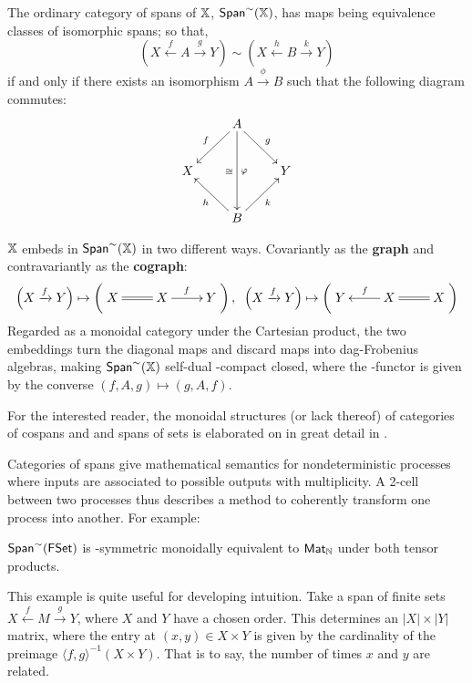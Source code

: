 \begin{definition}
The ordinary category of spans of $\mathbb{X}$, $\mathsf{Span}^\sim(\mathbb{X})$, has maps being equivalence classes of isomorphic spans; so that,
$$
(X\xleftarrow{f} A \xrightarrow{g} Y)
 \sim
(X\xleftarrow{h} B \xrightarrow{k} Y)
$$
if and only if there exists an isomorphism $A\xrightarrow{\phi} B$ such that the following diagram commutes:
$$
\xymatrix{
    & A \ar[dl]_{f} \ar[dr]^{g} \ar[dd]^{\phi}_{\cong}
    &
  \\X 
    &
    & Y
  \\
    & B \ar[ul]^{h} \ar[ur]_{k}
    &
}
$$
\end{definition}
$\mathbb{X}$ embeds in $\mathsf{Span}^\sim(\mathbb{X})$ in two different ways.  Covariantly as the {\bf graph} and contravariantly as the {\bf cograph}:
$$
\left(X\xrightarrow{f} Y \right) 
\mapsto
\left( 
\xymatrix{
X & X\ar@{=}[l] \ar[r]^{f} & Y
}
\right)
,\hspace*{.2cm}
\left(X\xrightarrow{f} Y \right) 
\mapsto
\left( 
\xymatrix{
Y & X \ar@{=}[r] \ar[l]_f & X
}
\right)
$$
 Regarded as a monoidal category under the Cartesian product, the two embeddings turn the diagonal maps and discard maps into dag-Frobenius algebras, making  $\mathsf{Span}^\sim(\mathbb{X})$  self-dual \dag-compact closed, where the \dag-functor is given by the converse  $(f,A,g)\mapsto (g,A,f)$.

For the interested reader, the monoidal structures (or lack thereof) of categories of cospans and and spans of sets is elaborated on in great detail in \cite{bruni}.

Categories of spans give mathematical semantics for nondeterministic processes where inputs are associated to possible outputs with multiplicity. 
A 2-cell between two processes thus describes a method to coherently transform one process into another.  For example:
\begin{example}
$\mathsf{Span}^\sim(\mathsf{FSet})$ is \dag-symmetric monoidally equivalent to $\mathsf{Mat}_{\mathbb{N}}$ under both tensor products.
\end{example}
This example is quite useful for developing intuition.  Take a span of finite sets $X\xleftarrow{f} M \xrightarrow{g} Y$, where $X$ and $Y$ have a chosen order. This determines an $|X|\times |Y|$ matrix, where the entry at $(x,y)\in X\times Y$ is given by the cardinality of the preimage $\langle f,g\rangle^{-1}(X\times Y)$.  That is to say, the number of times $x$ and $y$ are related.



